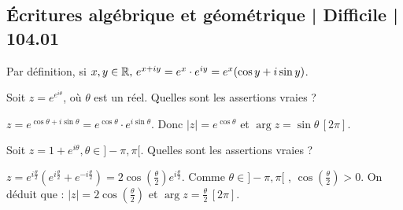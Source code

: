 \subsection{Écritures algébrique et géométrique | Difficile | 104.01}

\begin{question} 
Par définition, si  $x,y \in \mathbb{R}, \, e^{x+iy} = e^x \cdot e^{iy}= e^x (\cos y +i \sin y)$.

Soit $z=e^{e^{i\theta}}$, où $\theta$ est un réel. Quelles sont les assertions vraies ?
\begin{answers}
    
    


\end{answers}
\begin{explanations}
$z= e^{\cos  \theta + i \sin \theta}= e^{\cos\theta}\cdot e^{i \sin \theta}.  $ Donc $|z|=e^{\cos \theta} $ et $\arg z = \sin \theta \, [2\pi]$.
\end{explanations}

\end{question}


\begin{question} 

Soit $z=1+ e^{i\theta},\theta \in ]-\pi,\pi[$. Quelles sont les assertions vraies ?
\begin{answers}
    
    


\end{answers}
\begin{explanations}
$z=e^{i\frac{\theta}{2}} (e^{i\frac{\theta}{2}} + e^{-i\frac{\theta}{2}}) = 2 \cos (\frac{\theta}{2}) e^{i\frac{\theta}{2}}$. Comme $\theta \in ]-\pi,\pi[$ ,  $\cos (\frac{\theta}{2})>0$. On déduit que : $|z|=2\cos (\frac{\theta}{2})$ et $\arg z =  \frac{\theta}{2} \, [2\pi]$.
\end{explanations}

\end{question}






